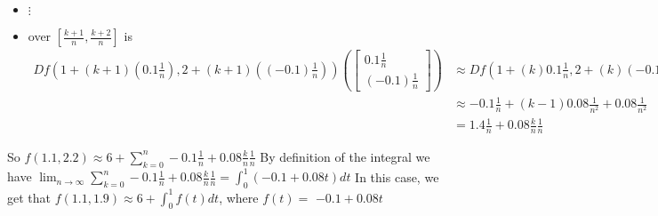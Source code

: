 \documentclass{article}
\newcommand{\verticalvector}[1]{\begin{bmatrix}#1\end{bmatrix}}
\newcommand{\answer}[1]{#1}
\newenvironment{question}{}{}
\newenvironment{hint}{}{}
\newenvironment{solution}{}{}
\begin{document}
\begin{question}
\begin{solution}
\begin{hint}
\begin{itemize}
        \begin{align*}
          Df(1+2(0.1\frac{1}{n}),2+2((-0.1)\frac{1}{n})) \left( \verticalvector{0.1\frac{1}{n}\\(-0.1)\frac{1}{n}} \right) 
          &\approx  Df(1+0.1\frac{1}{n},2+(-0.1)\frac{1}{n})\left( \verticalvector{0.1\frac{1}{n}\\(-0.1)\frac{1}{n}} \right) +D^2f\left(\verticalvector{0.1\frac{1}{n}\\(-0.1)\frac{1}{n}},\verticalvector{0.1\frac{1}{n}\\(-0.1)\frac{1}{n}}\right)\\
          &\approx -0.1\frac{1}{n} + 0.08\frac{1}{n^2}+ 0.08\frac{1}{n^2}\\
          &=1.4\frac{1}{n}+0.08\frac{2}{n}\frac{1}{n}
        \end{align*}
      \item $\vdots$
      \item over $[\frac{k+1}{n},\frac{k+2}{n}]$ is
        \begin{align*}
          Df(1+(k+1)(0.1\frac{1}{n}),2+(k+1)((-0.1)\frac{1}{n}))\left( \verticalvector{0.1\frac{1}{n}\\(-0.1)\frac{1}{n}} \right) 
          &\approx  Df(1+(k)0.1\frac{1}{n},2+(k)(-0.1)\frac{1}{n})\left( \verticalvector{0.1\frac{1}{n}\\(-0.1)\frac{1}{n}} \right) +D^2f\left(\verticalvector{0.1\frac{1}{n}\\(-0.1)\frac{1}{n}},\verticalvector{0.1\frac{1}{n}\\(-0.1)\frac{1}{n}}\right)\\
          &\approx -0.1\frac{1}{n} + (k-1)0.08\frac{1}{n^2}+ 0.08\frac{1}{n^2}\\
          &=1.4\frac{1}{n}+0.08\frac{k}{n}\frac{1}{n}
        \end{align*}
      \end{itemize}
      
    \end{hint}
    \begin{hint}
      So \(f(1.1,2.2) \approx 6+ \displaystyle\sum_{k=0}^{n} -0.1\frac{1}{n} +0.08\frac{k}{n}\frac{1}{n} \)
    \end{hint}
    \begin{hint}
      By definition of the integral we have \(\displaystyle\lim_{n \to \infty} \displaystyle\sum_{k=0}^{n} -0.1\frac{1}{n} +0.08\frac{k}{n}\frac{1}{n} = \displaystyle\int_0^1 (-0.1+0.08t) dt\)
    \end{hint}
    In this case, we get that $f(1.1,1.9) \approx 6+ \displaystyle\int_0^{1} f(t) dt$, where $f(t)=$\answer{ $-0.1+0.08t$}
  \end{solution}
  

\end{question}
\end{document}
